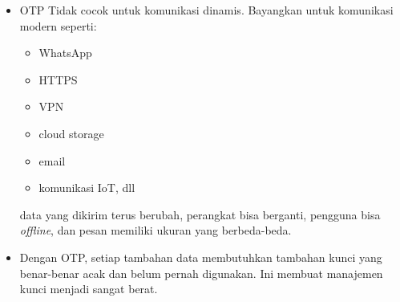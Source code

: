 \documentclass{article}
\begin{document}

\begin{itemize}
    \item OTP Tidak cocok untuk komunikasi dinamis. Bayangkan untuk komunikasi modern seperti:
    \begin{itemize}
        \item WhatsApp
        \item HTTPS
        \item VPN
        \item cloud storage
        \item email
        \item komunikasi IoT, dll
    \end{itemize}
    data yang dikirim terus berubah, perangkat bisa berganti, pengguna bisa \textit{offline}, dan pesan memiliki ukuran yang berbeda-beda.
    \vspace{5mm}
    \item Dengan OTP, setiap tambahan data membutuhkan tambahan kunci yang benar-benar acak dan belum pernah digunakan. Ini membuat manajemen kunci menjadi sangat berat.
\end{itemize}
\end{document}
